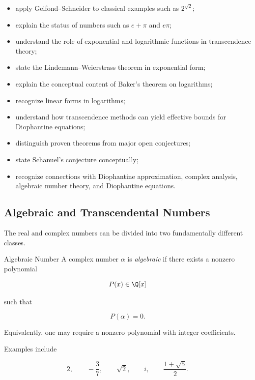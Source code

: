{\begin{itemize}
    \item apply Gelfond--Schneider to classical examples such as
    \(2^{\sqrt2}\);
    \item explain the status of numbers such as \(e+\pi\) and \(e\pi\);
    \item understand the role of exponential and logarithmic functions in
    transcendence theory;
    \item state the Lindemann--Weierstrass theorem in exponential form;
    \item explain the conceptual content of Baker's theorem on logarithms;
    \item recognize linear forms in logarithms;
    \item understand how transcendence methods can yield effective bounds
    for Diophantine equations;
    \item distinguish proven theorems from major open conjectures;
    \item state Schanuel's conjecture conceptually;
    \item recognize connections with Diophantine approximation,
    complex analysis, algebraic number theory, and Diophantine equations.
\end{itemize}
}

\subsection{Algebraic and Transcendental Numbers}
\label{subsec:algebraic-transcendental-numbers}

The real and complex numbers can be divided into two fundamentally different
classes.

\begin{definitionbox}{Algebraic Number}
A complex number \(\alpha\) is \emph{algebraic} if there exists a nonzero
polynomial

\[ P(x)\in\Q[x] \]

such that

\[ \boxed{P(\alpha)=0.} \]
\end{definitionbox}

Equivalently, one may require a nonzero polynomial with integer coefficients.

Examples include

\[ 2,\qquad -\frac37,\qquad \sqrt2,\qquad i,\qquad\frac{1+\sqrt5}{2}. \]

